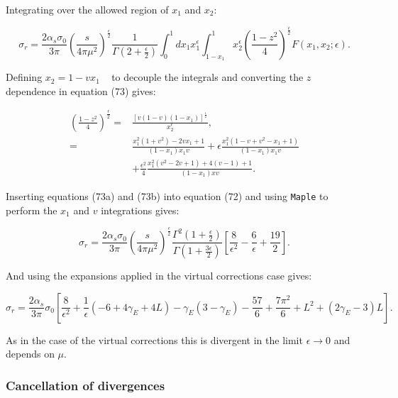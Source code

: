 	Integrating over the allowed region of $x_1$ and $x_2$:

	\begin{equation}
		\sigma_r = \frac{2\alpha_s\sigma_0}{3\pi}\left(\frac{s}{4\pi\mu^2}\right)^{\frac{\epsilon}{2}}\frac{1}{\Gamma(2+\frac{\epsilon}{2})}
		\int_0^1dx_1x_1^\epsilon\int^1_{1-x_1}x_2^\epsilon\left(\frac{1-z^2}{4}\right)^{\frac{\epsilon}{2}}F(x_1, x_2;\epsilon).
	\end{equation}

	Defining $x_2=1-vx_1$ ~\cite{field} to decouple the integrals and converting the $z$ dependence in equation (73) gives:

	\begin{align}
		\left(\frac{1-z^2}{4}\right)^{\frac{\epsilon}{2}} = &\frac{[v(1-v)(1-x_1)]^\frac{\epsilon}{2}}{x_2^\epsilon},\\
		= &\frac{x_1^2(1+v^2)-2vx_1+1}{(1-x_1)x_1v} + \epsilon\frac{x_1^2(1-v+v^2-x_1+1)}
		{(1-x_1)x_1v} \\&+\frac{\epsilon^2}{4}\frac{x_1^2(v^2-2v+1) + 4(v-1) + 1}{(1-x_1)xv}.
	\end{align}

	Inserting equations (73a) and (73b) into equation (72) and using \texttt{Maple} to perform the $x_1$ and $v$ integrations gives: ~\cite{primes}

	\begin{equation}
		\sigma_r = \frac{2\alpha_s\sigma_0}{3\pi}\left(\frac{s}{4\pi\mu^2}\right)^{\frac{\epsilon}{2}}\frac{\Gamma^2
		\left(1+\frac{\epsilon}{2}\right)}{\Gamma\left(1+\frac{3\epsilon}{2}\right)}\left[\frac{8}{\epsilon^2} - \frac{6}{\epsilon} + \frac{19}{2}\right].
	\end{equation}

	And using the expansions applied in the virtual corrections case gives:

	\begin{equation*}
		\sigma_r = \frac{2\alpha_s}{3\pi}\sigma_0\left[\frac{8}{\epsilon^2} + \frac{1}{\epsilon}\left(-6+4\gamma_E+4L\right)-
		\gamma_E(3-\gamma_E)-\frac{57}{6}+\frac{7\pi^2}{6}+L^2+(2\gamma_E-3)L\right].
	\end{equation*}

	As in the case of the virtual corrections this is divergent in the limit $\epsilon\rightarrow0$ and depends on $\mu$.

	\subsubsection{Cancellation of divergences}

